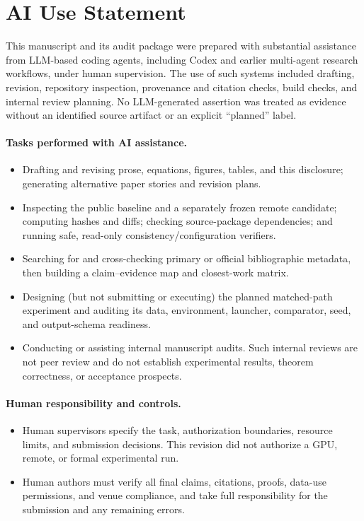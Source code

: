 
\section*{AI Use Statement}
\label{sec:ai-use}

This manuscript and its audit package were prepared with substantial assistance
from LLM-based coding agents, including Codex and earlier multi-agent research
workflows, under human supervision. The use of such systems included drafting,
revision, repository inspection, provenance and citation checks, build checks,
and internal review planning. No LLM-generated assertion was treated as
evidence without an identified source artifact or an explicit ``planned'' label.

\paragraph{Tasks performed with AI assistance.}
\begin{itemize}
  \item Drafting and revising prose, equations, figures, tables, and this
  disclosure; generating alternative paper stories and revision plans.
  \item Inspecting the public baseline and a separately frozen remote candidate;
  computing hashes and diffs; checking source-package dependencies; and running
  safe, read-only consistency/configuration verifiers.
  \item Searching for and cross-checking primary or official bibliographic
  metadata, then building a claim--evidence map and closest-work matrix.
  \item Designing (but not submitting or executing) the planned matched-path
  experiment and auditing its data, environment, launcher, comparator, seed,
  and output-schema readiness.
  \item Conducting or assisting internal manuscript audits. Such internal
  reviews are not peer review and do not establish experimental results,
  theorem correctness, or acceptance prospects.
\end{itemize}

\paragraph{Human responsibility and controls.}
\begin{itemize}
  \item Human supervisors specify the task, authorization boundaries, resource
  limits, and submission decisions. This revision did not authorize a GPU,
  remote, or formal experimental run.
  \item Human authors must verify all final claims, citations, proofs, data-use
  permissions, and venue compliance, and take full responsibility for the
  submission and any remaining errors.
\end{itemize}

